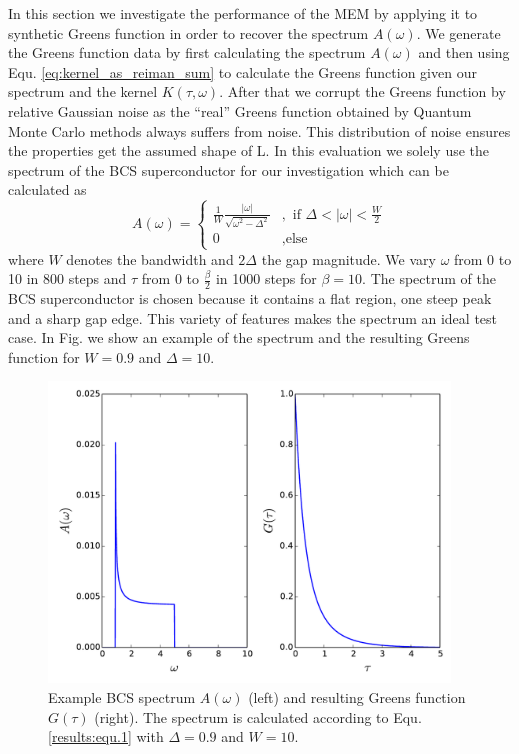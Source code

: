 In this section we investigate the performance of the MEM by applying it to synthetic Greens function in order to recover the spectrum $A(\omega)$. We generate the Greens function data by first calculating the spectrum $A(\omega)$ and then using Equ. \ref{eq:kernel_as_reiman_sum} to calculate the Greens function given our spectrum and the kernel $K(\tau,\omega)$. After that we corrupt the Greens function by relative Gaussian noise as the ``real'' Greens function obtained by Quantum Monte Carlo methods always suffers from noise. This distribution of noise ensures the properties get the assumed shape of L. In this evaluation we solely use the spectrum of the BCS superconductor for our investigation which can be calculated as
\begin{equation}
	A(\omega) = 
		\begin{cases}
			\frac{1}{W} \frac{|\omega|}{\sqrt{\omega^2 - \Delta^2}}&, \text{ if } \Delta < |\omega| < \frac{W}{2} \\
			0 &, \text{else}
		\end{cases}
	\label{results:equ.1}
\end{equation}
where $W$ denotes the bandwidth and $2\Delta$ the gap magnitude. We vary $\omega$ from 0 to 10 in 800 steps and $\tau$ from 0 to $\frac{\beta}{2}$ in 1000 steps for $\beta = 10$. The spectrum of the BCS superconductor is chosen because it contains a flat region, one steep peak and a sharp gap edge. This variety of features makes the spectrum an ideal test case.
In Fig. we show an example of the spectrum and the resulting Greens function for $W = 0.9$ and $\Delta = 10$.
\begin{figure}[htbp]
	\centering
	\includegraphics[width=0.95\textwidth]{./images/BCS_A_G_example.pdf}
	\caption{Example BCS spectrum $A(\omega)$ (left) and resulting Greens function $G(\tau)$ (right). The spectrum is calculated according to Equ. \ref{results:equ.1} with $\Delta = 0.9$ and $W = 10$.}
	\label{results:fig.1}
\end{figure}
\FloatBarrier
